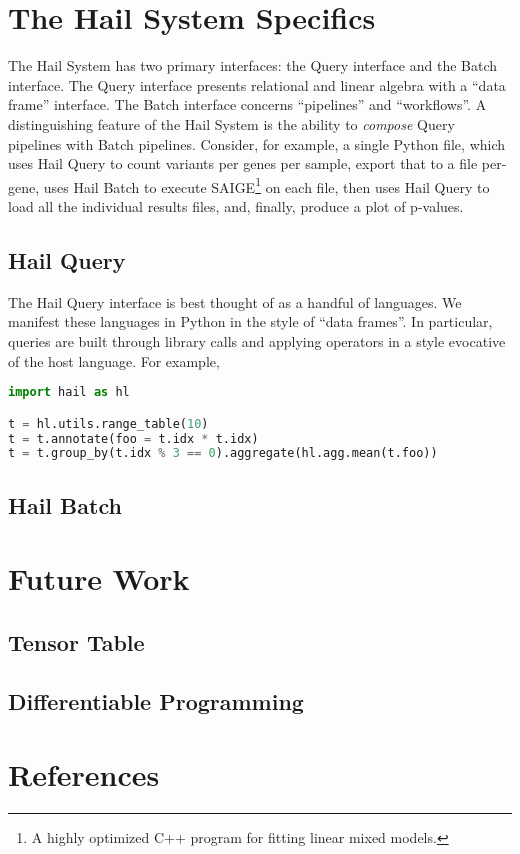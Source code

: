 \documentclass[10pt]{article}
\begin{document}
\section{The Hail System Specifics}

The Hail System has two primary interfaces: the Query interface and the Batch interface.
The Query interface presents relational and linear algebra with a ``data frame'' interface.
The Batch interface concerns ``pipelines'' and ``workflows''.
A distinguishing feature of the Hail System is the ability to \emph{compose} Query pipelines with Batch pipelines.
Consider, for example, a single Python file, which uses Hail Query to count variants per genes per sample, export that to a file per-gene, uses Hail Batch to execute SAIGE\footnote{A highly optimized C++ program for fitting linear mixed models.} on each file, then uses Hail Query to load all the individual results files, and, finally, produce a plot of p-values.

\subsection{Hail Query}

The Hail Query interface is best thought of as a handful of languages.
We manifest these languages in Python in the style of ``data frames''.
In particular, queries are built through library calls and applying operators in a style evocative of the host language.
For example,

\begin{lstlisting}[language=Python, caption=Am example of Hail's ``data frame'' style]
import hail as hl

t = hl.utils.range_table(10)
t = t.annotate(foo = t.idx * t.idx)
t = t.group_by(t.idx % 3 == 0).aggregate(hl.agg.mean(t.foo))
\end{lstlisting}


\subsection{Hail Batch}

\section{Future Work}
\subsection{Tensor Table}
\subsection{Differentiable Programming}
\cite{dremel}
\cite{numpywren}
\cite{rdd}
\cite{towards-scalable-dataframe-systems}

\section{References}
\printbibliography
\end{document}
